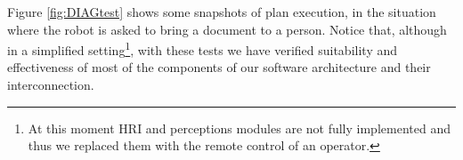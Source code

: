 Figure \ref{fig:DIAGtest} shows some snapshots of plan execution, in the situation where the robot is asked to bring a document to a person. 
Notice that, although in a simplified setting\footnote{At this moment HRI and perceptions modules are not fully implemented and thus we replaced them with the remote control of an operator.}, with these tests we have verified suitability and effectiveness of most of the components of our software architecture and their interconnection.


